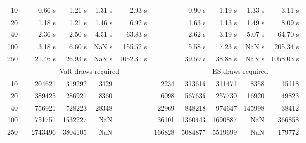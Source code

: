 {{\begin{longtable}{rr rrrr r rrrr}
10 & & 0.66 s & 1.21 s & 1.31 s & 2.93 s && 0.90 s & 1.19 s & 1.33 s & 3.11 s \\ 
20 & & 1.18 s & 1.21 s & 1.46 s & 6.92 s && 1.63 s & 1.13 s & 1.49 s & 8.09 s \\ 
40 & & 2.36 s & 2.50 s & 4.51 s & 63.83 s && 2.62 s & 3.19 s & 5.07 s & 64.70 s \\ 
100 & & 3.18 s & 6.60 s &  NaN s & 155.52 s && 5.58 s & 7.23 s &  NaN s & 205.34 s \\ 
250 & & 21.46 s & 26.93 s &  NaN s & 1052.31 s && 39.59 s & 38.88 s &  NaN s & 1058.03 s \\ 
\hline 
 && \multicolumn{4}{c}{VaR draws required} &&   \multicolumn{4}{c}{ES draws required} \\  \cline{3-6}  \cline{8-11} 
10 & & 204621 & 319292 & 3429 & & 2234 & 313616 & 311471 & 8358  & 15118 \\ 
20 & & 389425 & 286921 & 8360 & & 6098 & 567636 & 257730 & 16920  & 49823 \\ 
40 & & 756921 & 728223 & 28348 & & 22969 & 848218 & 974647 & 145998  & 38412 \\ 
100 & & 751751 & 1532227 & NaN & & 36101 & 1360443 & 1690887 & NaN  & 366858 \\ 
250 & & 2743496 & 3804105 & NaN & & 166828 & 5084877 & 5519699 & NaN  & 179772 \\ 
\hline 
\end{longtable} 
} 
} 
